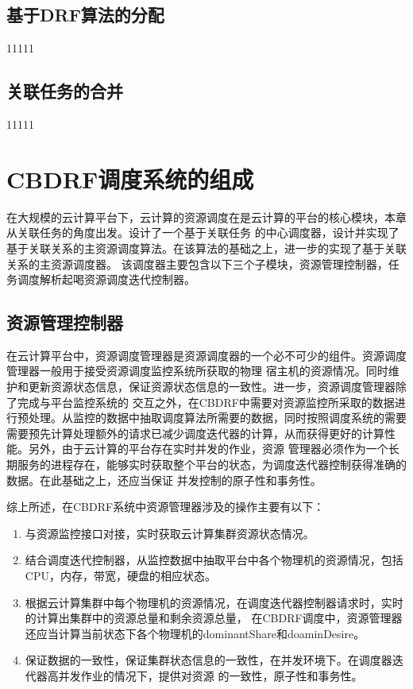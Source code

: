 \subsection{基于DRF算法的分配}
11111

\subsection{关联任务的合并}
11111

\section{CBDRF调度系统的组成}
在大规模的云计算平台下，云计算的资源调度在是云计算的平台的核心模块，本章从关联任务的角度出发。设计了一个基于关联任务
的中心调度器，设计并实现了基于关联关系的主资源调度算法。在该算法的基础之上，进一步的实现了基于关联关系的主资源调度器。
该调度器主要包含以下三个子模块，资源管理控制器，任务调度解析起喝资源调度迭代控制器。
\subsection{资源管理控制器}
在云计算平台中，资源调度管理器是资源调度器的一个必不可少的组件。资源调度管理器一般用于接受资源调度监控系统所获取的物理
宿主机的资源情况。同时维护和更新资源状态信息，保证资源状态信息的一致性。进一步，资源调度管理器除了完成与平台监控系统的
交互之外，在CBDRF中需要对资源监控所采取的数据进行预处理。从监控的数据中抽取调度算法所需要的数据，同时按照调度系统的需要
需要预先计算处理额外的请求已减少调度迭代器的计算，从而获得更好的计算性能。另外，由于云计算的平台存在实时并发的作业，资源
管理器必须作为一个长期服务的进程存在，能够实时获取整个平台的状态，为调度迭代器控制获得准确的数据。在此基础之上，还应当保证
并发控制的原子性和事务性。

综上所述，在CBDRF系统中资源管理器涉及的操作主要有以下：
\begin{enumerate}
\item 与资源监控接口对接，实时获取云计算集群资源状态情况。
\item 结合调度迭代控制器，从监控数据中抽取平台中各个物理机的资源情况，包括CPU，内存，带宽，硬盘的相应状态。
\item 根据云计算集群中每个物理机的资源情况，在调度迭代器控制器请求时，实时的计算出集群中的资源总量和剩余资源总量，
在CBDRF调度中，资源管理器还应当计算当前状态下各个物理机的dominantShare和doaminDesire。
\item 保证数据的一致性，保证集群状态信息的一致性，在并发环境下。在调度器迭代器高并发作业的情况下，提供对资源
的一致性，原子性和事务性。
\end{enumerate}
